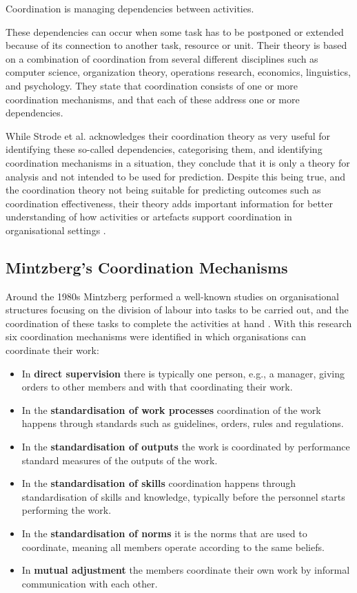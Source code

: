 \begin{fancyquotes}
Coordination is managing dependencies between activities.
\end{fancyquotes}

These dependencies can occur when some task has to be postponed or extended because of its connection to another task, resource or unit. Their theory is based on a combination of coordination from several different disciplines such as computer science, organization theory, operations research, economics, linguistics, and psychology. They state that coordination consists of one or more coordination mechanisms, and that each of these address one or more dependencies.

While Strode et al. acknowledges their coordination theory as very useful for identifying these so-called dependencies, categorising them, and identifying coordination mechanisms in a situation, they conclude that it is only a theory for analysis and not intended to be used for prediction. Despite this being true, and the coordination theory not being suitable for predicting outcomes such as coordination effectiveness, their theory adds important information for better understanding of how activities or artefacts support coordination in organisational settings \cite{Strode2012}.

\subsection{Mintzberg's Coordination Mechanisms}

Around the 1980s Mintzberg performed a well-known studies on organisational structures focusing on the division of labour into tasks to be carried out, and the coordination of these tasks to complete the activities at hand \cite{mintzberg1989mintzberg}. With this research six coordination mechanisms were identified in which organisations can coordinate their work:

\begin{itemize}
  \item In \textbf{direct supervision} there is typically one person, e.g., a manager, giving orders to other members and with that coordinating their work.
  \item In the \textbf{standardisation of work processes} coordination of the work happens through standards such as guidelines, orders, rules and regulations.
  \item In the \textbf{standardisation of outputs} the work is coordinated by performance standard measures of the outputs of the work.
  \item In the \textbf{standardisation of skills} coordination happens through standardisation of skills and knowledge, typically before the personnel starts performing the work.
  \item In the \textbf{standardisation of norms} it is the norms that are used to coordinate, meaning all members operate according to the same beliefs.
  \item In \textbf{mutual adjustment} the members coordinate their own work by informal communication with each other.
\end{itemize}

